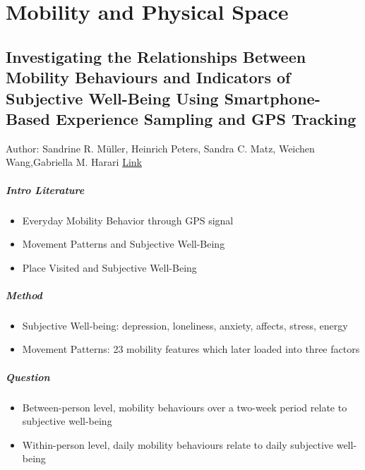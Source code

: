 \chapter{Mobility and Physical Space}

\section{Investigating the Relationships Between Mobility Behaviours and Indicators of Subjective Well-Being Using Smartphone-Based Experience Sampling and GPS Tracking}

Author: Sandrine R. Müller, Heinrich Peters, Sandra C. Matz,  Weichen Wang,Gabriella M. Harari
\href{https://onlinelibrary.wiley.com/doi/10.1002/per.2262}{Link}

\paragraph{Intro Literature} 
\begin{itemize}
    \item Everyday Mobility Behavior through GPS signal
    \item Movement Patterns and Subjective Well-Being
    \item Place Visited and Subjective Well-Being 
\end{itemize}

\paragraph{Method} 
    \begin{itemize}
        \item Subjective Well-being: depression, loneliness, anxiety, affects, stress, energy 
        \item Movement Patterns: 23 mobility features which later loaded into three factors
    \end{itemize}

\paragraph{Question}
    \begin{itemize}
        \item Between-person level, mobility behaviours over a two-week period relate to subjective well-being
        \item Within-person level, daily mobility behaviours relate to daily subjective well-being 
    \end{itemize}





